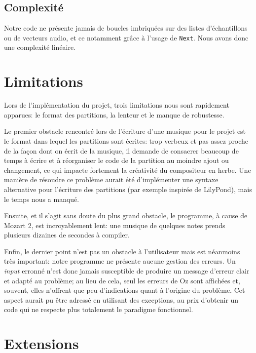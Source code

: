 \documentclass[a4paper,12pt]{article}
\begin{document}
\subsection{Complexité}

Notre code ne présente jamais de boucles imbriquées sur des listes d'échantillons ou de vecteurs audio, et ce notamment grâce à l'usage de \texttt{Next}. Nous avons donc une complexité linéaire. 

\section{Limitations}

Lors de l'implémentation du projet, trois limitations nous sont rapidement apparues: le format des partitions, la lenteur et le manque de robustesse.

Le premier obstacle rencontré lors de l'écriture d'une musique pour le projet est le format dans lequel les partitions sont écrites: trop verbeux et pas assez proche de la façon dont on écrit de la musique, il demande de consacrer beaucoup de temps à écrire et à réorganiser le code de la partition au moindre ajout ou changement, ce qui impacte fortement la créativité du compositeur en herbe. Une manière de résoudre ce problème aurait été d'implémenter une syntaxe alternative pour l'écriture des partitions (par exemple inspirée de LilyPond\footnotemark), mais le temps nous a manqué.

Ensuite, et il s'agit sans doute du plus grand obstacle, le programme, à cause de Mozart 2, est incroyablement lent: une musique de quelques notes prends plusieurs dizaines de secondes à \og{}compiler\fg{}.

Enfin, le dernier point n'est pas un obstacle à l'utilisateur mais est néanmoins très important: notre programme ne présente aucune gestion des erreurs. Un \emph{input} erronné n'est donc jamais susceptible de produire un message d'erreur clair et adapté au problème; au lieu de cela, seul les erreurs de Oz sont affichées et, souvent, elles n'offrent que peu d'indications quant à l'origine du problème. Cet aspect aurait pu être adressé en utilisant des exceptions, au prix d'obtenir un code qui ne respecte plus totalement le paradigme fonctionnel.

\section{Extensions}
\end{document}
